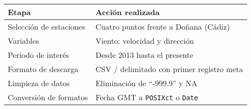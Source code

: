 \documentclass[
]{article}
\begin{document}
\begin{longtable}[]{@{}
  >{\raggedright\arraybackslash}p{}
  >{\raggedright\arraybackslash}p{}@{}}
\toprule\noalign{}
\begin{minipage}[b]{\linewidth}\raggedright
Etapa
\end{minipage} & \begin{minipage}[b]{\linewidth}\raggedright
Acción realizada
\end{minipage} \\
\midrule\noalign{}
\endhead
\bottomrule\noalign{}
\endlastfoot
Selección de estaciones & Cuatro puntos frente a Doñana (Cádiz) \\
Variables & Viento: velocidad y dirección \\
Periodo de interés & Desde 2013 hasta el presente \\
Formato de descarga & CSV / delimitado con primer registro meta \\
Limpieza de datos & Eliminación de ``‑999.9'' y NA \\
Conversión de formatos & Fecha GMT a \texttt{POSIXct} o \texttt{Date} \\
\end{longtable}
\end{document}
